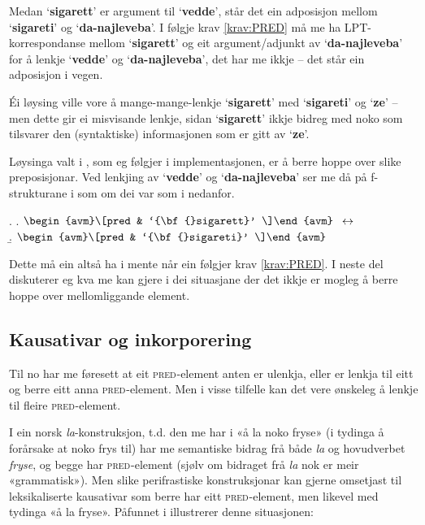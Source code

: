 \documentclass[11pt,a4paper,oneside,draft]{book}
\newcommand{\F}[2]{\textsc{#1}\ensuremath{_{#2}}}
\newcommand{\PRED}{\F{pred}{}}
\newcommand{\p}[1]{`\textbf{#1}'}
\begin{document}
 Medan \p{sigarett} er argument til \p{vedde}, står det ein adposisjon
 mellom \p{sigareti} og \p{da-najleveba}. I følgje krav
 \ref{krav:PRED} må me ha LPT-korrespondanse mellom \p{sigarett} og
 eit argument/adjunkt av \p{da-najleveba} for å lenkje \p{vedde} og
 \p{da-najleveba}, det har me ikkje -- det står ein adposisjon i vegen.

 Éi løysing ville vore å mange-mange-lenkje \p{sigarett} med
 \p{sigareti} og \p{ze} -- men dette gir ei misvisande lenkje, sidan
 \p{sigarett} ikkje bidreg med noko som tilsvarer den (syntaktiske)
 informasjonen som er gitt av \p{ze}. 

 Løysinga valt i \citet[s.~75,~fotnote~3]{dyvik2009lmp}, som eg
 følgjer i implementasjonen, er å berre hoppe over slike
 preposisjonar. Ved lenkjing av \p{vedde} og \p{da-najleveba} ser me
 då på f-strukturane i \Last som om dei var som i \Next nedanfor.

{\avmoptions{}
\ex. \a. $\begin{avm}\[pred & `{\bf{}sigarett}' \]\end{avm}\\$
     $\\\leftrightarrow$\\
     \b.     $\begin{avm}\[pred & `{\bf{}sigareti}' \]\end{avm}$

}

 Dette må ein altså ha i mente når ein følgjer krav \ref{krav:PRED}. I
 neste del diskuterer eg kva me kan gjere i dei situasjane der det
 ikkje er mogleg å berre hoppe over mellomliggande element.

\subsection{Kausativar og inkorporering}
\label{sec-3.6.5}

\label{SEC:f-mange-mange}

Til no har me føresett at eit \PRED{}-element anten er ulenkja, eller
er lenkja til eitt og berre eitt anna \PRED{}-element. Men i visse
tilfelle kan det vere ønskeleg å lenkje til fleire \PRED{}-element.

I ein norsk \emph{la}-konstruksjon, t.d. den me har i «å la noko fryse» (i
tydinga å forårsake at noko frys til) har me semantiske bidrag frå
både \emph{la} og hovudverbet \emph{fryse}, og begge har \PRED{}-element (sjølv om
bidraget frå \emph{la} nok er meir «grammatisk»). Men slike perifrastiske
konstruksjonar kan gjerne omsetjast til leksikaliserte kausativar som
berre har eitt \PRED{}-element, men likevel med tydinga «å la
fryse». Påfunnet i \Next illustrerer denne situasjonen:
\end{document}
